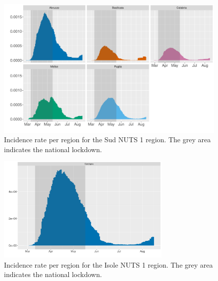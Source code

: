 \documentclass[12pt]{article}
\begin{document}
\begin{appendices}
    	\begin{figure}[H]
    	    \centering
    	    \includegraphics[width=0.94\linewidth]{output/infective_rates_Sud.pdf}
    	    \caption{Incidence rate per region for the Sud NUTS 1 region. The grey area indicates the national lockdown.}
    	    \label{fig:incidence_sud}
    	\end{figure}
    	
    	\begin{figure}[H]
    	    \centering
    	    \includegraphics[width=0.75\textwidth]{output/infective_rates_Isole.pdf}
    	    \caption{Incidence rate per region for the Isole NUTS 1 region. The grey area indicates the national lockdown.}
    	    \label{fig:incidence_isole}
    	\end{figure}
		
		
		

\end{appendices}
\end{document}
